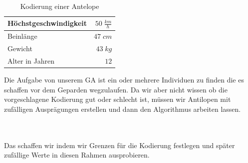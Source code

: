             \begin{multicols}{2}
                \hfill \\[-10mm]
                \begin{table}[H]
                    \begin{center}
                    \begin{tabular}{ |l|r| } 
                        \hline
                        Höchstgeschwindigkeit    & $ 50\; \frac{km}{h}$   \\ \hline
                        Beinlänge                & $ 47\; cm          $   \\ \hline
                        Gewicht                  & $ 43\; kg          $   \\ \hline
                        Alter in Jahren          & $ 12               $   \\ \hline
                    \end{tabular}
                    \end{center}
                    \caption{Kodierung einer Antelope \label{fig:somelabel}}
                \end{table}\par

                \noindent
                Die Aufgabe von unserem GA ist ein oder mehrere Individuen zu finden die es schaffen vor dem Geparden wegzulaufen. Da wir aber nicht wissen ob die vorgeschlagene Kodierung gut oder schlecht ist, müssen wir Antilopen mit zufälligen Ausprägungen erstellen und dann den Algorithmus arbeiten lassen.
            \end{multicols}\\
            \\
            \noindent
            Das schaffen wir indem wir Grenzen für die Kodierung festlegen und später zufällige Werte in diesen Rahmen ausprobieren.

